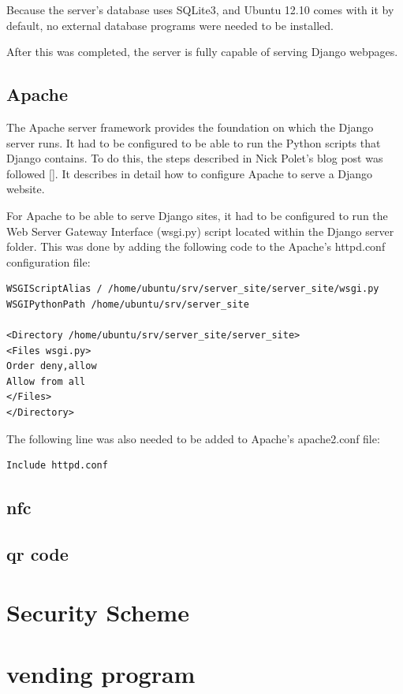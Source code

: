 Because the server's database uses SQLite3, and Ubuntu 12.10 comes with it by default, no
external database programs were needed to be installed. 

After this was completed, the server is fully capable of serving Django webpages. 

\subsection{Apache}

The Apache server framework provides the foundation on which the Django server runs. It had to
be configured to be able to run the Python scripts that Django contains. To do this, the steps
described in Nick Polet's blog post was followed [\cite{article:apache-setup}]. It describes
in detail how to configure Apache to serve a Django website.

For Apache to be able to serve Django sites, it had to be configured to run the Web Server
Gateway Interface (wsgi.py) script located within the Django server folder. This was done by
adding the following code to the Apache's httpd.conf configuration file:

\begin{verbatim}
WSGIScriptAlias / /home/ubuntu/srv/server_site/server_site/wsgi.py
WSGIPythonPath /home/ubuntu/srv/server_site

<Directory /home/ubuntu/srv/server_site/server_site>
<Files wsgi.py>
Order deny,allow
Allow from all
</Files>
</Directory>
\end{verbatim}

The following line was also needed to be added to Apache's apache2.conf file:

\begin{verbatim}
Include httpd.conf
\end{verbatim}

\subsection{nfc}
\subsection{qr code}

\section{Security Scheme}
\label{sec:security-code-scheme}

\section{vending program}
